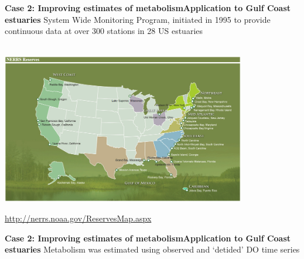 \documentclass[serif]{beamer}\usepackage[]{graphicx}\usepackage[]{color}
\begin{document}
\begin{frame}{\textbf{Case 2: Improving estimates of metabolism}}{\textbf{Application to Gulf Coast estuaries}}
System Wide Monitoring Program, initiated in 1995 to provide continuous data at over 300 stations in 28 US estuaries \\~\\
\centerline{\includegraphics[width = 0.8\textwidth]{fig/NERRS_locations.png}}
\tiny
\flushright
\href{http://nerrs.noaa.gov/ReservesMap.aspx}{http://nerrs.noaa.gov/ReservesMap.aspx}
\end{frame}

\begin{frame}{\textbf{Case 2: Improving estimates of metabolism}}{\textbf{Application to Gulf Coast estuaries}}
Metabolism was estimated using observed and `detided' DO time series
\end{frame}
\end{document}
